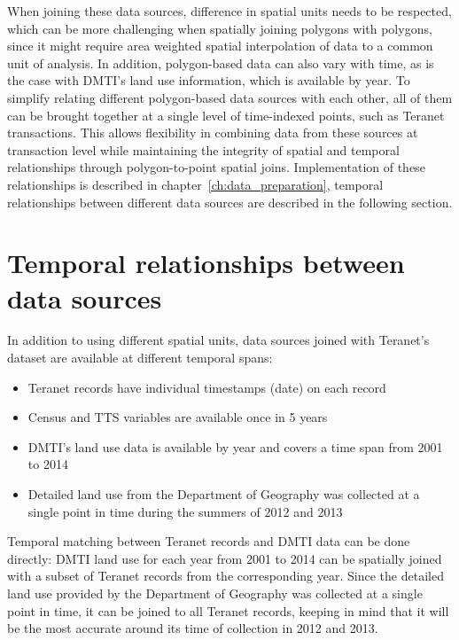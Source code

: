 When joining these data sources, difference in spatial units needs to be respected, which can be more challenging when spatially joining polygons with polygons, since it might require area weighted spatial interpolation of data to a common unit of analysis.
In addition, polygon-based data can also vary with time, as is the case with DMTI's land use information, which is available by year.
To simplify relating different polygon-based data sources with each other, all of them can be brought together at a single level of time-indexed points, such as Teranet transactions.
This allows flexibility in combining data from these sources at transaction level while maintaining the integrity of spatial and temporal relationships through polygon-to-point spatial joins.
Implementation of these relationships is described in chapter~\ref{ch:data_preparation}, temporal relationships between different data sources are described in the following section.

\section{Temporal relationships between data sources} \label{sec:termporal_relationships_between_datasets}

In addition to using different spatial units, data sources joined with Teranet's dataset are available at different temporal spans:
\begin{itemize}
    \item Teranet records have individual timestamps (date) on each record
    \item Census and TTS variables are available once in 5 years
    \item DMTI's land use data is available by year and covers a time span from 2001 to 2014
    \item Detailed land use from the Department of Geography was collected at a single point in time during the summers of 2012 and 2013
\end{itemize}

Temporal matching between Teranet records and DMTI data can be done directly: DMTI land use for each year from 2001 to 2014 can be spatially joined with a subset of Teranet records from the corresponding year.
Since the detailed land use provided by the Department of Geography was collected at a single point in time, it can be joined to all Teranet records, keeping in mind that it will be the most accurate around its time of collection in 2012 and 2013.

